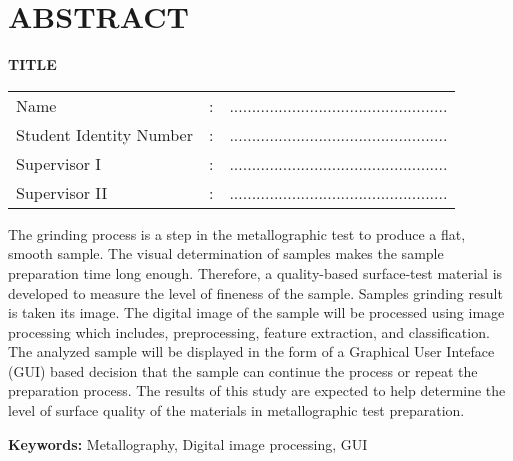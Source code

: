 \chapter*{ABSTRACT}
\fontsize{14pt}{1.5em}\selectfont
\begin{center}
	\uppercase{\textbf{title}}\\
\end{center}
\begin{tabular}{lcl}
	Name & : & .................................................\\
	Student Identity Number & : & .................................................\\
	Supervisor I &	: & .................................................\\
	Supervisor II &	: & .................................................\\
\end{tabular}

\singlespacing
\noindent The grinding process is a step in the metallographic test to produce a flat, smooth sample. The visual determination of samples makes the sample preparation time long enough. Therefore, a quality-based surface-test material is developed to measure the level of fineness of the sample. Samples grinding result is taken its image. The digital image of the sample will be processed using image processing which includes, preprocessing, feature extraction, and classification. The analyzed sample will be displayed in the form of a Graphical User Inteface (GUI) based decision that the sample can continue the process or repeat the preparation process. The results of this study are expected to help determine the level of surface quality of the materials in metallographic test preparation.

\noindent\textbf{Keywords:} Metallography, Digital image processing, GUI